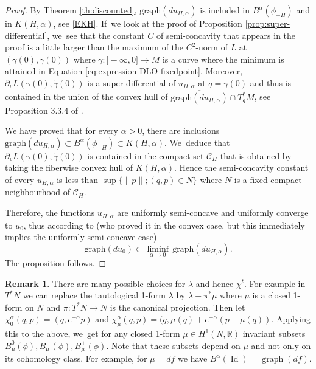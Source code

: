 \documentclass[JEP,XML,SOM,Unicode,NoFloatCountersInSection,published]{cedram}
\theoremstyle{definition}
\newtheorem{rem}[thm]{Remark}
\DeclareMathOperator{\Id}{Id}
\DeclareMathOperator{\gra}{graph}
\begin{document}
\begin{proof} By Theorem \ref{th:discounted}, $\mathrm{graph}(du_{H,\alpha})$ is included in $B^\alpha(\phi_{-H})$ and in $K(H,\alpha)$, see \eqref{EKH}. If~we look at the proof of Proposition \ref{prop:super-differential}, we~see that the constant $C$ of semi-concavity that appears in the proof is a little larger than the maximum of the $C^2$-norm of $L$
at $(\gamma(0),\dot\gamma(0))$ where $\gamma :{}]-\infty, 0]\to M$ is a curve where the minimum is attained in Equation \eqref{eq:expression-DLO-fixedpoint}. Moreover, $\partial_vL(\gamma(0), \dot\gamma(0))$ is
a super-differential of $u_{H, \alpha}$ at $q=\gamma(0)$ and thus is contained in the union of the convex hull of $\overline{\text{graph}(du_{H, \alpha})}\cap T_q^*M$, see Proposition 3.3.4 of \cite{CanSin04}.

We have proved that for every $\alpha>0$, there are inclusions $\text{graph}(du_{H, \alpha})\subset B^{\alpha}(\phi_{-H})\subset K(H,\alpha)$. We~deduce that $\partial_vL(\gamma(0), \dot\gamma(0))$ is contained in the compact set $\mathcal C_{H}$ that is obtained by taking the fiberwise convex hull of $K(H,\alpha)$. Hence the semi-concavity constant of every $u_{H, \alpha}$ is less than $\sup\{ \| p\|; (q, p)\in N\}$ where $N$ is a fixed compact neighbourhood of $\mathcal C_H$.

Therefore, the functions $u_{H,\alpha}$ are uniformly semi-concave and uniformly converge to $u_0$, thus according to \cite{Attouch} (who proved it in the convex case, but this immediately implies the uniformly semi-concave case)
\[
\mathrm{graph}(du_0)\subset \liminf_{\alpha\to 0}\,\mathrm{graph}(du_{H,\alpha}).
\]
The proposition follows.
\end{proof}

\begin{rem}
There are many possible choices for $\lambda$ and hence $\chi^t$. For example in $T^*N$ we can replace the tautological 1-form $\lambda$ by $\lambda-\pi^*\mu$ where $\mu$ is a closed 1-form on $N$ and $\pi:T^*N\to N$ is the canonical projection. Then let $\chi_0^\alpha(q,p)=(q,e^{-\alpha}p)$ and $\chi_\mu^\alpha(q,p)=(q,\mu(q)+e^{-\alpha}(p-\mu(q))$. Applying this to the above, we~get for any closed 1-form $\mu\in H^1(N, \mathbb R)$ invariant subsets $B_{\mu}^0(\phi), B_{\mu}^-(\phi), B_{\mu}^+(\phi)$.
Note that these subsets depend on $\mu$ and not only on its cohomology class. For example, for $\mu=df$ we have $B^\alpha(\Id)=\gra(df)$.
\end{rem}
\end{document}
